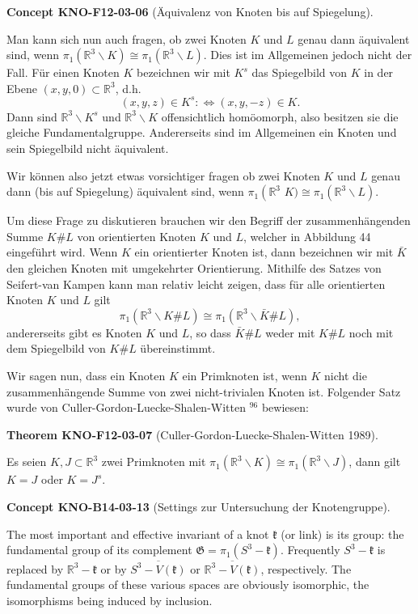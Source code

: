 \documentclass[10pt, letterpaper]{article}
\newcommand{\CustomHeading}[3]{%
  \par\medskip\noindent%
  \textbf{#1 #2} \textnormal{(#3)}.\enskip%
}
\newenvironment{THEO}[2]{\CustomHeading{Theorem}{#1}{#2}}{}
\newenvironment{CONC}[2]{\CustomHeading{Concept}{#1}{#2}}{}
\begin{document}
\begin{CONC}{KNO-F12-03-06}{Äquivalenz von Knoten bis auf Spiegelung}
Man kann sich nun auch fragen, ob zwei Knoten $K$ und $L$ genau dann äquivalent sind, wenn $\pi_1\left(\mathbb{R}^3 \backslash K\right) \cong \pi_1\left(\mathbb{R}^3 \backslash L\right)$. Dies ist im Allgemeinen jedoch nicht der Fall. Für einen Knoten $K$ bezeichnen wir mit $K^s$ das Spiegelbild von $K$ in der Ebene $(x, y, 0) \subset \mathbb{R}^3$, d.h.
$$
(x, y, z) \in K^s: \Leftrightarrow(x, y,-z) \in K .
$$
Dann sind $\mathbb{R}^3 \backslash K^s$ und $\mathbb{R}^3 \backslash K$ offensichtlich homöomorph, also besitzen sie die gleiche Fundamentalgruppe. Andererseits sind im Allgemeinen ein Knoten und sein Spiegelbild nicht äquivalent.

Wir können also jetzt etwas vorsichtiger fragen ob zwei Knoten $K$ und $L$ genau dann (bis auf Spiegelung) äquivalent sind, wenn $\pi_1\left(\mathbb{R}^3 \right.$ $K) \cong \pi_1\left(\mathbb{R}^3 \backslash L\right)$.

Um diese Frage zu diskutieren brauchen wir den Begriff der zusammenhängenden Summe $K \# L$ von orientierten Knoten $K$ und $L$, welcher in Abbildung 44 eingeführt wird. Wenn $K$ ein orientierter Knoten ist, dann bezeichnen wir mit $\bar{K}$ den gleichen Knoten mit umgekehrter Orientierung. Mithilfe des Satzes von Seifert-van Kampen kann man relativ leicht zeigen, dass für alle orientierten Knoten $K$ und $L$ gilt
$$
\pi_1\left(\mathbb{R}^3 \backslash K \# L\right) \cong \pi_1\left(\mathbb{R}^3 \backslash \bar{K} \# L\right),
$$
andererseits gibt es Knoten $K$ und $L$, so dass $\bar{K} \# L$ weder mit $K \# L$ noch mit dem Spiegelbild von $K \# L$ übereinstimmt.

Wir sagen nun, dass ein Knoten $K$ ein Primknoten ist, wenn $K$ nicht die zusammenhängende Summe von zwei nicht-trivialen Knoten ist. Folgender Satz wurde von Culler-Gordon-Luecke-Shalen-Witten ${ }^{96}$ bewiesen:
\end{CONC}

\begin{THEO}{KNO-F12-03-07}{Culler-Gordon-Luecke-Shalen-Witten 1989}
Es seien $K, J \subset \mathbb{R}^3$ zwei Primknoten mit $\pi_1\left(\mathbb{R}^3 \backslash K\right) \cong \pi_1\left(\mathbb{R}^3 \backslash J\right)$, dann gilt $K=J$ oder $K=J^s$.
\end{THEO}

\begin{CONC}{KNO-B14-03-13}{Settings zur Untersuchung der Knotengruppe}
The most important and effective invariant of a knot $\mathfrak{k}$ (or link) is its group: the fundamental group of its complement $\mathfrak{G}=\pi_{1}\left(S^{3}-\mathfrak{k}\right)$. Frequently $S^{3}-\mathfrak{k}$ is replaced by $\mathbb{R}^{3}-\mathfrak{k}$ or by $\overline{S^{3}-V(\mathfrak{k})}$ or $\overline{\mathbb{R}^{3}-V(\mathfrak{k})}$, respectively. The fundamental groups of these various spaces are obviously isomorphic, the isomorphisms being induced by inclusion.
\end{CONC}
\end{document}
